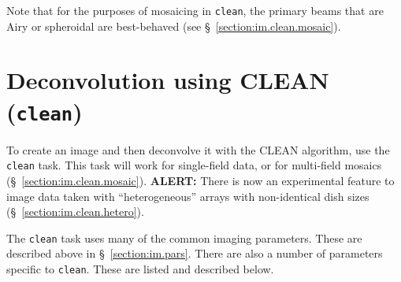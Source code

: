 Note that for the purposes of mosaicing in {\tt clean}, the primary
beams that are Airy or spheroidal are best-behaved 
(see \S~\ref{section:im.clean.mosaic}).

\section{Deconvolution using CLEAN ({\tt clean})}
\label{section:im.clean}

To create an image and then deconvolve it with the CLEAN algorithm,
use the {\tt clean} task.  This task will work for single-field data,
or for multi-field mosaics (\S~\ref{section:im.clean.mosaic}).  
{\bf ALERT:} There is now an experimental feature to image data taken with
``heterogeneous'' arrays with non-identical dish sizes 
(\S~\ref{section:im.clean.hetero}).

The {\tt clean} task uses many
of the common imaging parameters.  These are described above in
\S~\ref{section:im.pars}.  There are also a number of parameters
specific to {\tt clean}.  These are listed and described below.

